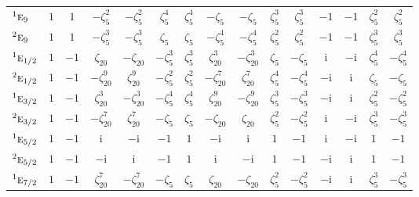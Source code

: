 \documentclass[10pt,a4paper]{article}
\makeatletter
\def\grouprule#1#2{\noalign{\marks\LTgroupmarks{\the\belowrulesep}\nobreak\vskip#1%
  \vskip\aboverulesep}\multispan\LT@cols\unskip{\leaders\hrule\@height#2\hfill\kern\z@}\cr
  \noalign{\penalty\LTrulebreak\vskip\belowrulesep\global\@lastruleclass\z@}}
\numberwithin{equation}{section}
\newcommand{\irr}[1]{\text{\normalfont\scshape #1}}
\newcommand{\conjpair}[1]{{}^{#1}}
\newcommand{\iunit}{\mathrm{i}}
\newcommand{\rootunity}[1]{\zeta_{#1}}
\makeatother
\begin{document}
{\begin{longtable}{@{}lcccccccccccccc@{}}
$\conjpair{1}\irr{e}_{9}$ & $1$ & $1$ & $-\rootunity{5}^{2}$ & $-\rootunity{5}^{2}$ & $\rootunity{5}^{4}$ & $\rootunity{5}^{4}$ & $-\rootunity{5}$ & $-\rootunity{5}$ & $\rootunity{5}^{3}$ & $\rootunity{5}^{3}$ & $-1$ & $-1$ & $\rootunity{5}^{2}$ & $\rootunity{5}^{2}$\\
$\conjpair{2}\irr{e}_{9}$ & $1$ & $1$ & $-\rootunity{5}^{3}$ & $-\rootunity{5}^{3}$ & $\rootunity{5}$ & $\rootunity{5}$ & $-\rootunity{5}^{4}$ & $-\rootunity{5}^{4}$ & $\rootunity{5}^{2}$ & $\rootunity{5}^{2}$ & $-1$ & $-1$ & $\rootunity{5}^{3}$ & $\rootunity{5}^{3}$\\
\grouprule{0pt}{\lightrulewidth}
$\conjpair{1}\irr{e}_{1/2}$ & $1$ & $-1$ & $\rootunity{20}$ & $-\rootunity{20}$ & $-\rootunity{5}^{3}$ & $\rootunity{5}^{3}$ & $\rootunity{20}^{3}$ & $-\rootunity{20}^{3}$ & $\rootunity{5}$ & $-\rootunity{5}$ & $\iunit{}$ & $-\iunit{}$ & $\rootunity{5}^{4}$ & $-\rootunity{5}^{4}$\\
$\conjpair{2}\irr{e}_{1/2}$ & $1$ & $-1$ & $-\rootunity{20}^{9}$ & $\rootunity{20}^{9}$ & $-\rootunity{5}^{2}$ & $\rootunity{5}^{2}$ & $-\rootunity{20}^{7}$ & $\rootunity{20}^{7}$ & $\rootunity{5}^{4}$ & $-\rootunity{5}^{4}$ & $-\iunit{}$ & $\iunit{}$ & $\rootunity{5}$ & $-\rootunity{5}$\\
$\conjpair{1}\irr{e}_{3/2}$ & $1$ & $-1$ & $\rootunity{20}^{3}$ & $-\rootunity{20}^{3}$ & $-\rootunity{5}^{4}$ & $\rootunity{5}^{4}$ & $\rootunity{20}^{9}$ & $-\rootunity{20}^{9}$ & $\rootunity{5}^{3}$ & $-\rootunity{5}^{3}$ & $-\iunit{}$ & $\iunit{}$ & $\rootunity{5}^{2}$ & $-\rootunity{5}^{2}$\\
$\conjpair{2}\irr{e}_{3/2}$ & $1$ & $-1$ & $-\rootunity{20}^{7}$ & $\rootunity{20}^{7}$ & $-\rootunity{5}$ & $\rootunity{5}$ & $-\rootunity{20}$ & $\rootunity{20}$ & $\rootunity{5}^{2}$ & $-\rootunity{5}^{2}$ & $\iunit{}$ & $-\iunit{}$ & $\rootunity{5}^{3}$ & $-\rootunity{5}^{3}$\\
$\conjpair{1}\irr{e}_{5/2}$ & $1$ & $-1$ & $\iunit{}$ & $-\iunit{}$ & $-1$ & $1$ & $-\iunit{}$ & $\iunit{}$ & $1$ & $-1$ & $\iunit{}$ & $-\iunit{}$ & $1$ & $-1$\\
$\conjpair{2}\irr{e}_{5/2}$ & $1$ & $-1$ & $-\iunit{}$ & $\iunit{}$ & $-1$ & $1$ & $\iunit{}$ & $-\iunit{}$ & $1$ & $-1$ & $-\iunit{}$ & $\iunit{}$ & $1$ & $-1$\\
$\conjpair{1}\irr{e}_{7/2}$ & $1$ & $-1$ & $\rootunity{20}^{7}$ & $-\rootunity{20}^{7}$ & $-\rootunity{5}$ & $\rootunity{5}$ & $\rootunity{20}$ & $-\rootunity{20}$ & $\rootunity{5}^{2}$ & $-\rootunity{5}^{2}$ & $-\iunit{}$ & $\iunit{}$ & $\rootunity{5}^{3}$ & $-\rootunity{5}^{3}$\\

\end{longtable}}
\end{document}
